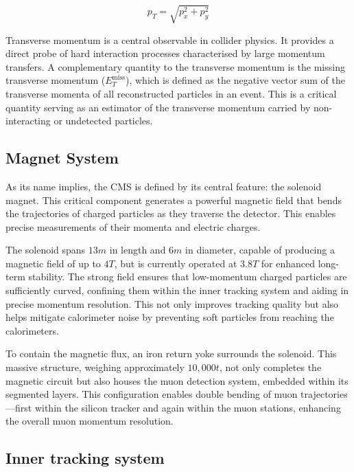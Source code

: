 \begin{equation}
    p_T = \sqrt{p_x^2 + p_y^2}
\end{equation}

Transverse momentum is a central observable in collider physics. It provides a direct probe of hard interaction processes characterised by large momentum transfers. A complementary quantity to the transverse momentum is the missing transverse momentum ($E_T^{\text{miss}}$), which is defined as the negative vector sum of the transverse momenta of all reconstructed particles in an event. This is a critical quantity serving as an estimator of the transverse momentum carried by non-interacting or undetected particles.

\subsection{Magnet System}

As its name implies, the CMS is defined by its central feature: the solenoid magnet. This critical component generates a powerful magnetic field that bends the trajectories of charged particles as they traverse the detector. This enables precise measurements of their momenta and electric charges. 

The solenoid spans $13\unit{m}$ in length and $6\unit{m}$ in diameter, capable of producing a magnetic field of up to $4\unit{T}$, but is currently operated at $3.8\unit{T}$ for enhanced long-term stability. The strong field ensures that low-momentum charged particles are sufficiently curved, confining them within the inner tracking system and aiding in precise momentum resolution. This not only improves tracking quality but also helps mitigate calorimeter noise by preventing soft particles from reaching the calorimeters.

To contain the magnetic flux, an iron return yoke surrounds the solenoid. This massive structure, weighing approximately $ 10,000\unit{t}$, not only completes the magnetic circuit but also houses the muon detection system, embedded within its segmented layers. This configuration enables double bending of muon trajectories—first within the silicon tracker and again within the muon stations, enhancing the overall muon momentum resolution.

\subsection{Inner tracking system}

